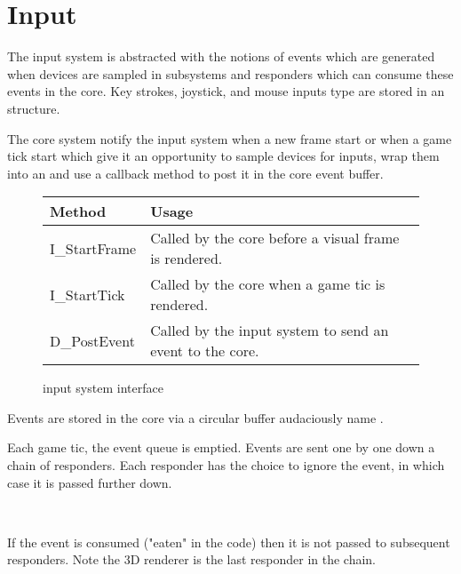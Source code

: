 \section{Input}
The input system is abstracted with the notions of events which are generated when devices are sampled in subsystems and responders which can consume these events in the core. Key strokes, joystick, and mouse inputs type are stored in an  structure.\\
\par
{}
\par
The core system notify the input system when a new frame start or when a game tick start which give it an opportunity to sample devices for inputs, wrap them into an  and use a callback method to post it in the core event buffer.\\
\par
\begin{figure}[H]
\centering  
\begin{tabularx}{\textwidth}{ L{0.6}  L{1.4}}
  \toprule
  \textbf{Method} &  \textbf{Usage}\\
  \toprule 
  I\_StartFrame & Called by the core before a visual frame is rendered.\\
  I\_StartTick & Called by the core when a game tic is rendered.\\
  
  D\_PostEvent & Called by the input system to send an event to the core.\\
   \toprule
\end{tabularx}
\caption{\doom{} input system interface}
\end{figure}
\par
Events are stored in the core via a circular buffer audaciously name .\\
\par
{}

\par
Each game tic, the event queue is emptied. Events are sent one by one down a chain of responders. Each responder has the choice to ignore the event, in which case it is passed further down.\\
\par
{}\\
 \par If the event is consumed ("eaten" in the code) then it is not passed to subsequent responders. Note the 3D renderer is the last responder in the chain.\\
 

